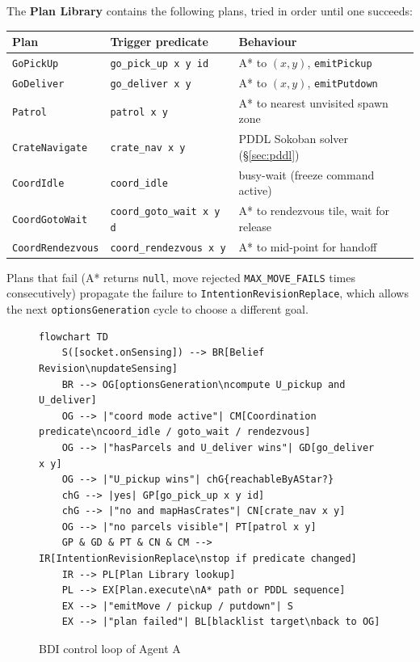 \documentclass[10pt,a4paper,twocolumn]{article}
\begin{document}
\noindent The \textbf{Plan Library} contains the following plans, tried in order
until one succeeds:

\begin{center}
\footnotesize
\begin{tabularx}{\columnwidth}{@{} l l X @{}}
\toprule
\textbf{Plan} & \textbf{Trigger predicate} & \textbf{Behaviour} \\
\midrule
\texttt{GoPickUp}       & \texttt{go\_pick\_up x y id}    & A* to $(x,y)$, \texttt{emitPickup} \\
\texttt{GoDeliver}      & \texttt{go\_deliver x y}         & A* to $(x,y)$, \texttt{emitPutdown} \\
\texttt{Patrol}         & \texttt{patrol x y}              & A* to nearest unvisited spawn zone \\
\texttt{CrateNavigate}  & \texttt{crate\_nav x y}          & PDDL Sokoban solver (§\ref{sec:pddl}) \\
\texttt{CoordIdle}      & \texttt{coord\_idle}             & busy-wait (freeze command active) \\
\texttt{CoordGotoWait}  & \texttt{coord\_goto\_wait x y d} & A* to rendezvous tile, wait for release \\
\texttt{CoordRendezvous}& \texttt{coord\_rendezvous x y}   & A* to mid-point for handoff \\
\bottomrule
\end{tabularx}
\end{center}

\noindent Plans that fail (A* returns \texttt{null}, move rejected
\texttt{MAX\_MOVE\_FAILS} times consecutively) propagate the failure to
\texttt{IntentionRevisionReplace}, which allows the next \texttt{optionsGeneration}
cycle to choose a different goal.

\begin{figure}[H]
\caption{BDI control loop of Agent A}
\begin{lstlisting}[language={}]
flowchart TD
    S([socket.onSensing]) --> BR[Belief Revision\nupdateSensing]
    BR --> OG[optionsGeneration\ncompute U_pickup and U_deliver]
    OG --> |"coord mode active"| CM[Coordination predicate\ncoord_idle / goto_wait / rendezvous]
    OG --> |"hasParcels and U_deliver wins"| GD[go_deliver x y]
    OG --> |"U_pickup wins"| chG{reachableByAStar?}
    chG --> |yes| GP[go_pick_up x y id]
    chG --> |"no and mapHasCrates"| CN[crate_nav x y]
    OG --> |"no parcels visible"| PT[patrol x y]
    GP & GD & PT & CN & CM --> IR[IntentionRevisionReplace\nstop if predicate changed]
    IR --> PL[Plan Library lookup]
    PL --> EX[Plan.execute\nA* path or PDDL sequence]
    EX --> |"emitMove / pickup / putdown"| S
    EX --> |"plan failed"| BL[blacklist target\nback to OG]
\end{lstlisting}
\end{figure}
\end{document}

